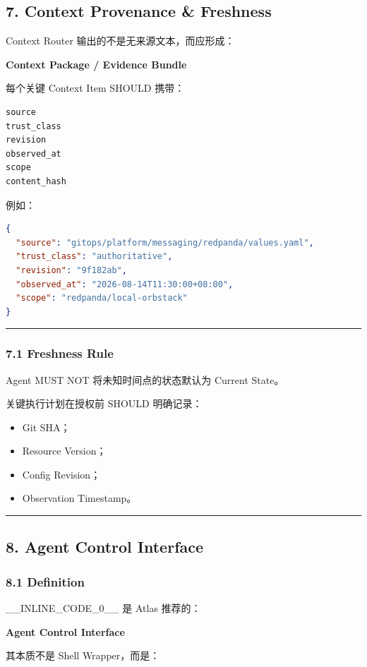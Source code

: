 \documentclass[11pt,a4paper]{article}
\begin{document}
\subsection{7. Context Provenance \& Freshness}
Context Router 输出的不是无来源文本，而应形成：

\begin{gfmBlockquote}
\textbf{Context Package / Evidence Bundle}
\end{gfmBlockquote}
每个关键 Context Item SHOULD 携带：

\begin{lstlisting}[language=text]
source
trust_class
revision
observed_at
scope
content_hash
\end{lstlisting}
例如：

\begin{lstlisting}[language=json]
{
  "source": "gitops/platform/messaging/redpanda/values.yaml",
  "trust_class": "authoritative",
  "revision": "9f182ab",
  "observed_at": "2026-08-14T11:30:00+08:00",
  "scope": "redpanda/local-orbstack"
}
\end{lstlisting}
\vspace{0.5em}\hrule\vspace{0.5em}
\subsubsection{7.1 Freshness Rule}
Agent MUST NOT 将未知时间点的状态默认为 Current State。

关键执行计划在授权前 SHOULD 明确记录：

\begin{itemize}
  \item Git SHA；
  \item Resource Version；
  \item Config Revision；
  \item Observation Timestamp。
\end{itemize}
\vspace{0.5em}\hrule\vspace{0.5em}
\subsection{8. Agent Control Interface}
\subsubsection{8.1 Definition}
\_\_INLINE\_CODE\_0\_\_ 是 Atlas 推荐的：

\begin{gfmBlockquote}
\textbf{Agent Control Interface}
\end{gfmBlockquote}
其本质不是 Shell Wrapper，而是：
\end{document}
